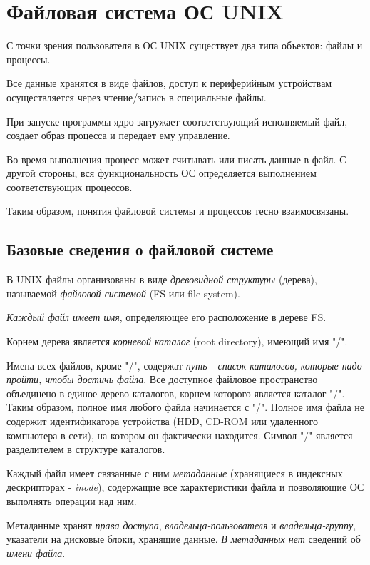 \chapter{Файловая система ОС UNIX}

С точки зрения пользователя в ОС UNIX существует два типа объектов: файлы и процессы.

 Все данные хранятся в виде файлов, доступ к периферийным устройствам осуществляется через чтение/запись  в специальные файлы. 

При запуске программы ядро загружает соответствующий исполняемый файл, создает образ процесса и передает ему управление.

Во время выполнения процесс  может считывать или писать данные в файл. С другой стороны, вся функциональность ОС определяется выполнением соответствующих процессов. 

Таким образом, понятия файловой системы и процессов тесно взаимосвязаны.

\section{Базовые сведения о файловой системе}

В UNIX файлы организованы в виде \emph{древовидной структуры} (дерева), называемой \emph{файловой системой} (FS или file system).

\emph{Каждый файл имеет имя}, определяющее его расположение в дереве FS.

Корнем дерева является \emph{корневой каталог} (root directory), имеющий имя "/".

Имена всех файлов, кроме "/", содержат \emph{путь - список каталогов, которые надо пройти, чтобы достичь файла}.
Все доступное файловое пространство объединено в единое дерево каталогов, корнем которого является каталог "/". Таким образом, полное имя любого файла начинается с "/". Полное имя файла не содержит идентификатора устройства (HDD, CD-ROM или удаленного компьютера в сети), на котором он фактически находится. Символ "/" является разделителем в структуре каталогов.

Каждый файл имеет связанные с ним \emph{метаданные} (хранящиеся в индексных дескрипторах - \emph{inode}), содержащие все характеристики файла и позволяющие ОС выполнять операции над ним.
 	
Метаданные хранят \emph{права доступа}, \emph{владельца-пользователя} и \emph{владельца-группу}, указатели на дисковые блоки, хранящие данные. \emph{В метаданных нет} сведений об \emph{имени файла}.


